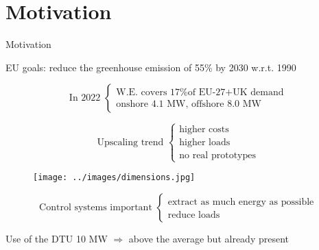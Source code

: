 \section{Motivation}
\begin{frame}{Motivation}
  \begin{myitemize}
    \item EU goals: reduce the greenhouse emission of 55\% by 2030 w.r.t. 1990
    \item 
    \[
      \text{In 2022 }
      \begin{cases}
        \text{W.E. covers 17\% of EU-27+UK demand}\\
        \text{onshore 4.1 MW, offshore 8.0 MW}
      \end{cases}
    \]
    
    \item 
    \begin{multicols}{2}
    \[
      \text{Upscaling trend } 
      \begin{cases}
        \text{higher costs}\\
        \text{higher loads}\\
        \text{no real prototypes} 
      \end{cases}  
    \]

      \begin{figure}
        \centering
        \texttt{[image: ../images/dimensions.jpg]}
      \end{figure}
  
    \end{multicols}
    
    \item
    \[
      \text{Control systems important }
      \begin{cases}
        \text{extract as much energy as possible}\\
        \text{reduce loads}
      \end{cases}
    \]

    \item Use of the DTU 10 MW $\Rightarrow$ above the average but already present
  \end{myitemize}



\end{frame}
